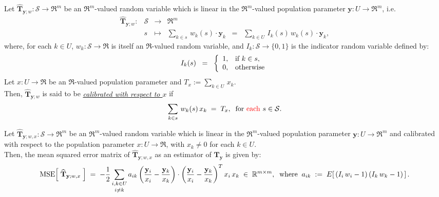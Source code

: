 \documentclass{article}
\begin{document}
\begin{definition}
\mbox{}
\vskip 0.1cm
\noindent
Let $\widehat{\mathbf{T}}_{\mathbf{y};w} : \mathcal{S} \longrightarrow \Re^{m}$
be an $\Re^{m}$-valued random variable which is linear in the $\Re^{m}$-valued
population parameter $\mathbf{y} : U \longrightarrow \Re^{m}$, i.e.
\begin{equation*}
\begin{array}{cccl}
\widehat{\mathbf{T}}_{\mathbf{y};w} : & \mathcal{S} & \longrightarrow & \Re^{m} \\
     & s &\longmapsto & \underset{k\in s}{\sum}\,w_{k}(s)\cdot\mathbf{y}_{k} \;\; = \;\; \underset{k\in U}{\sum}\,I_{k}(s)\,w_{k}(s)\cdot\mathbf{y}_{k},
\end{array}
\end{equation*}
where, for each $k \in U$, $w_{k} : \mathcal{S} \longrightarrow \Re$ is itself an $\Re$-valued random variable,
and $I_{k} : \mathcal{S} \longrightarrow \{0,1\}$ is the indicator random variable defined by:
\begin{equation*}
I_{k}(s)
\;\;=\;\;
\left\{
\begin{array}{cl}
1, & \textnormal{if $k \in s$}, \\
0, & \textnormal{otherwise}
\end{array}
\right.
\end{equation*}
Let $x : U \longrightarrow \Re$ be an $\Re$-valued population parameter
and  $T_{x} := \underset{k\in U}{\sum}\,x_{k}$.\\
Then, $\widehat{\mathbf{T}}_{\mathbf{y};w}$ is said to be
\underline{\emph{calibrated with respect to $x$}} if
\begin{equation*}
\sum_{k \in s}\,w_{k}(s)\,x_{k} \; = \; T_{x},
\;\;\textnormal{for {\color{red}each} $s \in \mathcal{S}$}.
\end{equation*}
\end{definition}

\begin{proposition}
\label{proposition:calibratedLinear:MSE}
\mbox{}
\vskip 0.1cm
\noindent
Let $\widehat{\mathbf{T}}_{\mathbf{y};w,x} : \mathcal{S} \longrightarrow \Re^{m}$ be an $\Re^{m}$-valued random variable 
which is linear in the $\Re^{m}$-valued population parameter $\mathbf{y} : U \longrightarrow \Re^{m}$
and calibrated with respect to the population parameter $x : U \longrightarrow \Re$, with $x_{k} \neq 0$ for each $k \in U$.\\
Then, the mean squared error matrix of $\widehat{\mathbf{T}}_{\mathbf{y};w,x}$ as an estimator of $\mathbf{T}_{\mathbf{y}}$ is given by:
\begin{equation*}
\textnormal{MSE}\!\left[\;\widehat{\mathbf{T}}_{\mathbf{y};w,x}\;\right]
\;=\;
- \dfrac{1}{2}\,\underset{i \neq k}{\sum_{i,k\in U}}\,a_{ik}
\left(\dfrac{\mathbf{y}_{i}}{x_{i}} - \dfrac{\mathbf{y}_{k}}{x_{k}}\right)\cdot\left(\dfrac{\mathbf{y}_{i}}{x_{i}} - \dfrac{\mathbf{y}_{k}}{x_{k}}\right)^{T}
x_{i}\,x_{k}
\;\in\;\mathbb{R}^{m \times m},
\;\;\textnormal{where}\;\;
a_{ik} \;:=\; E\!\left[\,\left(I_{i}\,w_{i}-1\right)\left(I_{k}\,w_{k}-1\right)\,\right].
\end{equation*}
\end{proposition}
\end{document}
